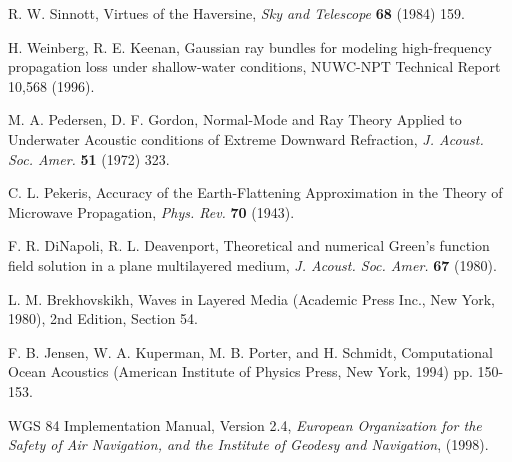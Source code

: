 \documentclass{ws-jca}
\begin{document}
\begin{thebibliography}{0}
 R. W. Sinnott, Virtues of the Haversine, {\it Sky and
Telescope} {\bf 68} (1984) 159.

 H. Weinberg, R. E. Keenan, Gaussian ray bundles for
modeling high-frequency propagation loss under shallow-water conditions, 
NUWC-NPT Technical Report 10,568 (1996).

 M. A. Pedersen, D. F. Gordon, Normal-Mode and Ray
Theory Applied to Underwater Acoustic conditions of Extreme Downward
Refraction, {\it J. Acoust. Soc. Amer.} {\bf 51} (1972) 323.

 C. L. Pekeris, Accuracy of the Earth-Flattening Approximation in the Theory of Microwave Propagation, {\it Phys. Rev.} {\bf 70} (1943).

 F. R. DiNapoli, R. L. Deavenport, Theoretical and
numerical Green's function field solution in a plane multilayered medium,
{\it J. Acoust. Soc. Amer.} {\bf 67} (1980).

 L. M. Brekhovskikh, Waves in Layered Media
(Academic Press Inc., New York, 1980), 2nd Edition, Section 54.

 F. B. Jensen, W. A. Kuperman, M. B. Porter, and H.
Schmidt, Computational Ocean Acoustics (American Institute of Physics
Press, New York, 1994) pp. 150-153.

 WGS 84 Implementation Manual, Version 2.4, {\it European
Organization for the Safety of Air Navigation, and the Institute of Geodesy
and Navigation}, (1998).

\end{thebibliography}
\end{document}
